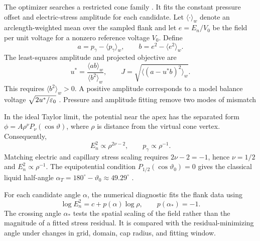The optimizer searches a restricted cone family . It fits the constant pressure offset and electric-stress amplitude for each candidate. Let $\langle\cdot\rangle_w$ denote an arclength-weighted mean over the sampled flank and let $e=E_n/V_0$ be the field per unit voltage for a nonzero reference voltage $V_0$. Define
\begin{equation}
 a=p_\gamma-\langle p_\gamma\rangle_w,\qquad
 b=e^2-\langle e^2\rangle_w.
\end{equation}
The least-squares amplitude and projected objective are
\begin{equation}
 u^*=\frac{\langle ab\rangle_w}{\langle b^2\rangle_w},\qquad
 J=\sqrt{\langle(a-u^*b)^2\rangle_w}.
\end{equation}
This requires $\langle b^2\rangle_w>0$. A positive amplitude corresponds to a model balance voltage $\sqrt{2u^*/\varepsilon_0}$ . Pressure and amplitude fitting remove two modes of mismatch

 In the ideal Taylor limit, the potential near the apex has the separated form $\phi=A\rho^\nu P_\nu(\cos\vartheta)$, where $\rho$ is distance from the virtual cone vertex. Consequently,
\begin{equation}
 E_n^2\propto\rho^{2\nu-2},\qquad p_\gamma\propto\rho^{-1}.
\end{equation}
Matching electric and capillary stress scaling requires $2\nu-2=-1$, hence $\nu=1/2$ and $E_n^2\propto\rho^{-1}$. The equipotential condition $P_{1/2}(\cos\vartheta_0)=0$ gives the classical liquid half-angle $\alpha_T=180^\circ-\vartheta_0\approx49.29^\circ$ \cite{taylor1964disintegration}. 

For each candidate angle $\alpha$, the numerical diagnostic fits the flank data using
\begin{equation}
 \log E_n^2=c+p(\alpha)\log\rho,
 \qquad p(\alpha_*)=-1.
\end{equation}
The crossing angle $\alpha_*$ tests the spatial scaling of the field rather than the magnitude of a fitted stress residual. It is compared with the residual-minimizing angle under changes in grid, domain, cap radius, and fitting window.

